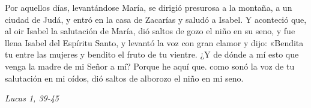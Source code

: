 \documentclass[../../devocionario.tex]{subfiles}
\begin{document}
    Por aquellos días, levantándose María, se dirigió presurosa a la montaña, a un ciudad de Judá, y entró en la casa de Zacarías y saludó a Isabel. 
    Y aconteció que, al oir Isabel la salutación de María, dió saltos de gozo el niño en su seno, y fue llena Isabel del Espíritu Santo, 
    y levantó la voz con gran clamor y dijo: «Bendita tu entre las mujeres y bendito el fruto de tu vientre. ¿Y de dónde a mí esto que venga la madre de mi Señor a mí? 
    Porque he aquí que. como sonó la voz de tu salutación en mi oídos, dió saltos de alborozo el niño en mi seno.
    
    \begin{flushright}
        \textit{Lucas 1, 39-45}
    \end{flushright}
\end{document}
